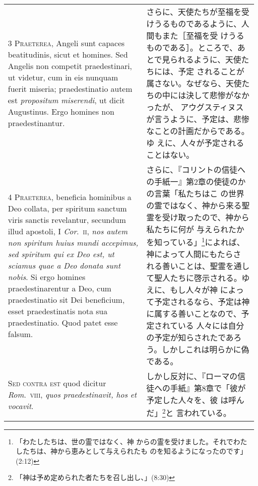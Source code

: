 \documentclass[10pt]{jsarticle} %
\begin{document}
\begin{longtable}{p{21em}p{21em}}
\\


{\scshape 3 Praeterea}, Angeli sunt capaces
beatitudinis, sicut et homines. Sed Angelis non competit praedestinari,
ut videtur, cum in eis nunquam fuerit miseria; praedestinatio autem est
{\itshape propositum miserendi}, ut dicit Augustinus. Ergo homines non
praedestinantur.


 
&

さらに、天使たちが至福を受けうるものであるように、人間もまた［至福を受
けうるものである］。ところで、あとで見られるように、天使たちには、予定
されることが属さない。なぜなら、天使たちの中には決して悲惨がなかったが、
アウグスティヌスが言うように、予定は、悲惨なことの計画だからである。ゆ
えに、人々が予定されることはない。

 
\\


{\scshape 4 Praeterea}, beneficia hominibus a Deo
collata, per spiritum sanctum viris sanctis revelantur, secundum illud
apostoli, I {\itshape Cor}.~{\scshape ii}, {\itshape nos autem non spiritum huius mundi accepimus, sed
spiritum qui ex Deo est, ut sciamus quae a Deo donata sunt nobis}. Si
ergo homines praedestinarentur a Deo, cum praedestinatio sit Dei
beneficium, esset praedestinatis nota sua praedestinatio. Quod patet
esse falsum.


 
&

さらに、『コリントの信徒への手紙一』第2章の使徒のかの言葉「私たちはこ
の世界の霊ではなく、神から来る聖霊を受け取ったので、神から私たちに何が
与えられたかを知っている」\footnote{「わたしたちは、世の霊ではなく、神
からの霊を受けました。それでわたしたちは、神から恵みとして与えられたも
のを知るようになったのです」(2:12)}によれば、神によって人間にもたらさ
れる善いことは、聖霊を通して聖人たちに啓示される。ゆえに、もし人々が神
によって予定されるなら、予定は神に属する善いことなので、予定されている
人々には自分の予定が知らされたであろう。しかしこれは明らかに偽である。
 

\\


{\scshape Sed contra est} quod dicitur {\itshape Rom}.~{\scshape viii}, {\itshape quos
praedestinavit, hos et vocavit}.


 
&

しかし反対に、『ローマの信徒への手紙』第8章で「彼が予定した人々を、彼
は呼んだ」\footnote{「神は予め定められた者たちを召し出し、」(8:30)}と
言われている。
 


\end{longtable}
\end{document}
